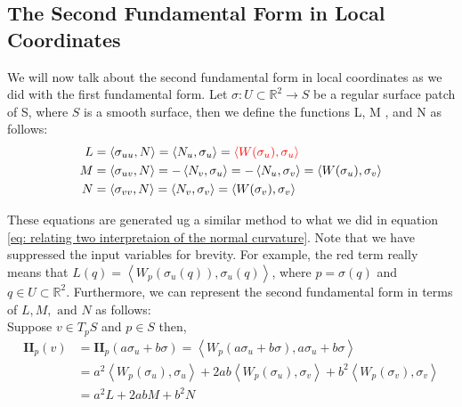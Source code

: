 \documentclass{article}
\theoremstyle{plain}
\theoremstyle{definition}
\theoremstyle{remark}
\newcommand{\R}{\mathbb{R}}
\begin{document}
\subsection{The Second Fundamental Form in Local Coordinates}
We will now talk about the second fundamental form in local coordinates as we did with the first fundamental form. Let \( \sigma: U \subset \R^2 \rightarrow S\) be a regular surface patch of S, where \(S\) is a smooth surface, then we define the functions L, M , and N as follows:
\begin{align} \label{eq: define second fundamental form in local coordinates}
    \begin{split}
        L & = \left\langle \sigma_{uu}, N\right\rangle = \left\langle N_u, \sigma_u\right\rangle = { \color{red}\left\langle W(\sigma_u), \sigma_u\right\rangle} \\
        M & = \left\langle \sigma_{uv}, N\right\rangle = - \left\langle N_v, \sigma_u\right\rangle = - \left\langle N_u, \sigma_v\right\rangle  = \left\langle W(\sigma_u), \sigma_v\right\rangle \\
        N & = \left\langle \sigma_{vv}, N\right\rangle = \left\langle N_v, \sigma_v\right\rangle = \left\langle W(\sigma_v), \sigma_v\right\rangle
    \end{split}
\end{align}

These equations are generated ug a similar method to what we did in equation \ref{eq: relating two interpretaion of the normal curvature}. Note that we have suppressed the input variables for brevity. For example, the red term really means that \( L(q) = \left\langle W_{p}(\sigma_u(q)), \sigma_u(q)\right\rangle \), where \(p = \sigma(q)\) and \(q \in U \subset \R^2\). Furthermore, we can represent the second fundamental form in terms of \(L, M, \text{ and } N\) as follows:\\
Suppose \( v \in T_pS\) and \( p \in S\) then,
\begin{align*}
    \mathbf{II}_p(v) & = \mathbf{II}_p(a\sigma_u + b\sigma) = \left\langle W_p(a\sigma_u + b\sigma), a\sigma_u + b\sigma \right\rangle                                                        \\
                     & = a^2 \left\langle W_p(\sigma_u), \sigma_u\right\rangle + 2ab\left\langle W_p(\sigma_u), \sigma_v\right\rangle + b^2\left\langle W_p(\sigma_v), \sigma_v \right\rangle \\
                     & = a^2 L + 2ab M + b^2 N
\end{align*}
\end{document}
